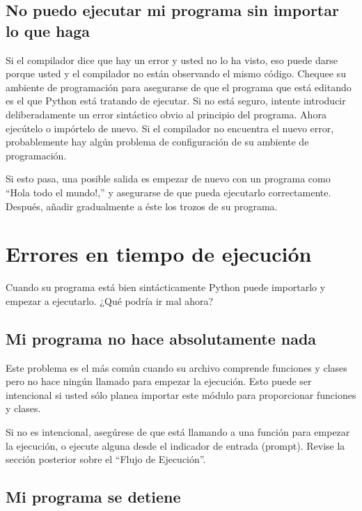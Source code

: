 \subsection{No puedo ejecutar mi programa sin importar lo que haga}

Si el compilador dice que hay un error y usted no lo ha visto, eso
puede darse porque usted y el compilador no están observando el mismo
código. Chequee su ambiente de programación para asegurarse de que
el programa que está editando es el que Python está tratando de ejecutar.
Si no está seguro, intente introducir deliberadamente un error sintáctico
obvio al principio del programa. Ahora ejecútelo o impórtelo de nuevo.
Si el compilador no encuentra el nuevo error, probablemente hay algún
problema de configuración de su ambiente de programación.

Si esto pasa, una posible salida es empezar de nuevo con un programa
como ``Hola todo el mundo!,'' y asegurarse de que pueda ejecutarlo
correctamente. Después, añadir gradualmente a éste los trozos de su
programa.

\section{Errores en tiempo de ejecución}

Cuando su programa está bien sintácticamente Python puede importarlo
y empezar a ejecutarlo. ¿Qué podría ir mal ahora?

\subsection{Mi programa no hace absolutamente nada}

Este problema es el más común cuando su archivo comprende funciones
y clases pero no hace ningún llamado para empezar la ejecución. Esto
puede ser intencional si usted sólo planea importar este módulo para
proporcionar funciones y clases.

Si no es intencional, asegúrese de que está llamando a una función
para empezar la ejecución, o ejecute alguna desde el indicador de
entrada (prompt). Revise la sección posterior sobre el ``Flujo de
Ejecución''.

\subsection{Mi programa se detiene}

  

